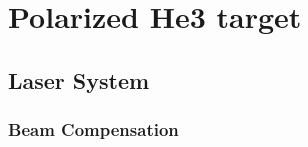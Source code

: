 

\chapter{Polarized He3 target}
\label{C4}

\section{Laser System}

\subsection{Beam Compensation}


\cite{*}

